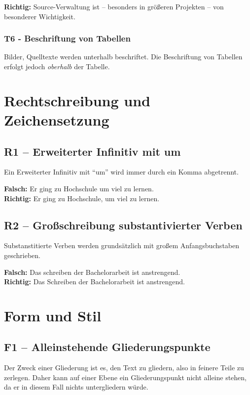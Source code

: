 \documentclass[a4paper,11pt,headings=normal]{scrartcl}
\begin{document}
\textbf{Richtig:} Source-Verwaltung ist -- besonders in größeren Projekten -- von besonderer Wichtigkeit.


\subsubsection*{T6 - Beschriftung von Tabellen}

Bilder, Quelltexte werden unterhalb beschriftet. Die Beschriftung von Tabellen erfolgt jedoch \textit{oberhalb} der Tabelle.


\section{Rechtschreibung und Zeichensetzung}

\subsection*{R1 -- Erweiterter Infinitiv mit um}

Ein Erweiterter Infinitiv mit "`um"' wird immer durch ein Komma abgetrennt.

\textbf{Falsch:} Er ging zu Hochschule um viel zu lernen. \\
\textbf{Richtig:} Er ging zu Hochschule, um viel zu lernen.


\subsection*{R2 -- Großschreibung substantivierter Verben}

Substanstitierte Verben werden grundsätzlich mit großem Anfangsbuchstaben geschrieben.

\textbf{Falsch:} Das schreiben der Bachelorarbeit ist anstrengend. \\
\textbf{Richtig:} Das Schreiben der Bachelorarbeit ist anstrengend.


\section{Form und Stil}

\subsection*{F1 -- Alleinstehende Gliederungspunkte}

Der Zweck einer Gliederung ist es, den Text zu gliedern, also in feinere Teile zu zerlegen. Daher kann auf einer Ebene ein Gliederungspunkt nicht alleine stehen, da er in diesem Fall nichts untergliedern würde.
\end{document}
